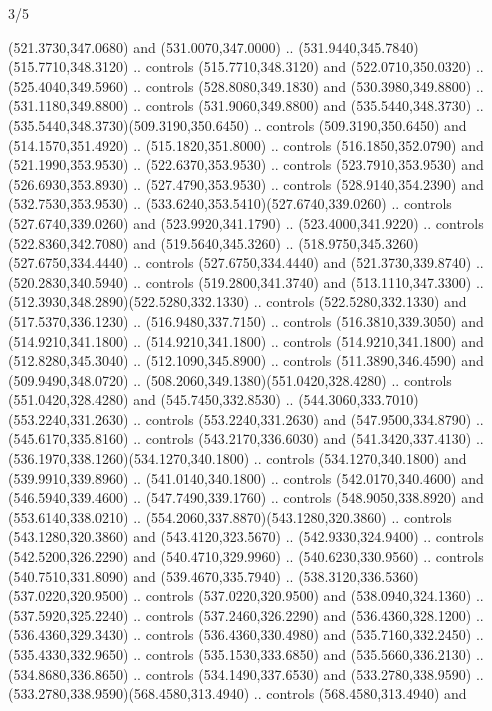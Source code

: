 \begin{flagdescription}{3/5}
\begin{scope}[shift={(0.5\flaglength,0.5\flagwidth)},scale=\flagwidth/1075]
\begin{scope}[y=0.80pt, x=0.80pt, yscale=-2.37, xscale=2.37,xshift=-402,yshift=-230.4]
  (521.3730,347.0680) and (531.0070,347.0000) ..
  (531.9440,345.7840)(515.7710,348.3120) .. controls (515.7710,348.3120) and
  (522.0710,350.0320) .. (525.4040,349.5960) .. controls (528.8080,349.1830) and
  (530.3980,349.8800) .. (531.1180,349.8800) .. controls (531.9060,349.8800) and
  (535.5440,348.3730) .. (535.5440,348.3730)(509.3190,350.6450) .. controls
  (509.3190,350.6450) and (514.1570,351.4920) .. (515.1820,351.8000) .. controls
  (516.1850,352.0790) and (521.1990,353.9530) .. (522.6370,353.9530) .. controls
  (523.7910,353.9530) and (526.6930,353.8930) .. (527.4790,353.9530) .. controls
  (528.9140,354.2390) and (532.7530,353.9530) ..
  (533.6240,353.5410)(527.6740,339.0260) .. controls (527.6740,339.0260) and
  (523.9920,341.1790) .. (523.4000,341.9220) .. controls (522.8360,342.7080) and
  (519.5640,345.3260) .. (518.9750,345.3260)(527.6750,334.4440) .. controls
  (527.6750,334.4440) and (521.3730,339.8740) .. (520.2830,340.5940) .. controls
  (519.2800,341.3740) and (513.1110,347.3300) ..
  (512.3930,348.2890)(522.5280,332.1330) .. controls (522.5280,332.1330) and
  (517.5370,336.1230) .. (516.9480,337.7150) .. controls (516.3810,339.3050) and
  (514.9210,341.1800) .. (514.9210,341.1800) .. controls (514.9210,341.1800) and
  (512.8280,345.3040) .. (512.1090,345.8900) .. controls (511.3890,346.4590) and
  (509.9490,348.0720) .. (508.2060,349.1380)(551.0420,328.4280) .. controls
  (551.0420,328.4280) and (545.7450,332.8530) ..
  (544.3060,333.7010)(553.2240,331.2630) .. controls (553.2240,331.2630) and
  (547.9500,334.8790) .. (545.6170,335.8160) .. controls (543.2170,336.6030) and
  (541.3420,337.4130) .. (536.1970,338.1260)(534.1270,340.1800) .. controls
  (534.1270,340.1800) and (539.9910,339.8960) .. (541.0140,340.1800) .. controls
  (542.0170,340.4600) and (546.5940,339.4600) .. (547.7490,339.1760) .. controls
  (548.9050,338.8920) and (553.6140,338.0210) ..
  (554.2060,337.8870)(543.1280,320.3860) .. controls (543.1280,320.3860) and
  (543.4120,323.5670) .. (542.9330,324.9400) .. controls (542.5200,326.2290) and
  (540.4710,329.9960) .. (540.6230,330.9560) .. controls (540.7510,331.8090) and
  (539.4670,335.7940) .. (538.3120,336.5360)(537.0220,320.9500) .. controls
  (537.0220,320.9500) and (538.0940,324.1360) .. (537.5920,325.2240) .. controls
  (537.2460,326.2290) and (536.4360,328.1200) .. (536.4360,329.3430) .. controls
  (536.4360,330.4980) and (535.7160,332.2450) .. (535.4330,332.9650) .. controls
  (535.1530,333.6850) and (535.5660,336.2130) .. (534.8680,336.8650) .. controls
  (534.1490,337.6530) and (533.2780,338.9590) ..
  (533.2780,338.9590)(568.4580,313.4940) .. controls (568.4580,313.4940) and

\end{scope}
\end{scope}
\end{flagdescription}
